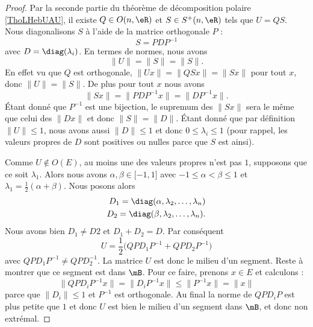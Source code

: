 \begin{proof}
    Par la seconde partie du théorème de décomposition polaire \ref{ThoLHebUAU}, il existe \( Q\in O(n,\eR)\) et \( S\in S^+(n,\eR)\) tels que \( U=QS\). Nous diagonalisons \( S\) à l'aide de la matrice orthogonale \( P\) :
    \begin{equation}
        S=PDP^{-1}
    \end{equation}
    avec \( D=\diag(\lambda_i)\). En termes de normes, nous avons
    \begin{equation}
        \| U \|=\| S \|=\| S \|.
    \end{equation}
    En effet vu que \( Q\) est orthogonale, \( \| Ux \|=\| QSx \|=\| Sx \|\) pour tout \( x\), donc \( \| U \|=\| S \|\). De plus pour tout \( x\) nous avons
    \begin{equation}
        \| Sx \|=\| PDP^{-1} x \|=\| DP^{-1}x \|.
    \end{equation}
    Étant donné que \( P^{-1}\) est une bijection, le supremum des \( \| Sx \|\) sera le même que celui des \( \| Dx \|\) et donc \( \| S \|=\| D \|\). Étant donné que par définition \( \| U \|\leq 1\), nous avons aussi \( \| D \|\leq 1\) et donc \( 0\leq\lambda_i\leq 1\) (pour rappel, les valeurs propres de \( D\) sont positives ou nulles parce que \( S\) est ainsi). 

    Comme \( U\notin O(E)\), au moins une des valeurs propres n'est pas \( 1\), supposons que ce soit \( \lambda_1\). Alors nous avons \( \alpha,\beta\in\mathopen[ -1 , 1 \mathclose]\) avec \( -1\leq \alpha<\beta\leq 1\) et \( \lambda_1=\frac{ 1 }{2}(\alpha+\beta)\). Nous posons alors
    \begin{subequations}
        \begin{align}
            D_1=\diag(\alpha,\lambda_2,\ldots, \lambda_n)\\
            D_2=\diag(\beta,\lambda_2,\ldots, \lambda_n).
        \end{align}
    \end{subequations}
    Nous avons bien \( D_1\neq D2\) et \( D_1+ D_2=D\). Par conséquent
    \begin{equation}
        U=\frac{ 1 }{2}\big( QPD_1P^{-1}+QPD_2P^{-1} \big)
    \end{equation}
    avec \( QPD_1P^{-1}\neq QPD_2^{-1}\). La matrice \( U \) est donc le milieu d'un segment. Reste à montrer que ce segment est dans \( \mB\). Pour ce faire, prenons \( x\in E\) et calculons :
    \begin{equation}
        \| QPD_iP^{-1}x \|=\| D_iP^{-1}x \|\leq\| P^{-1}x \|=\| x \|
    \end{equation}
    parce que \( \| D_i \|\leq 1\) et \( P^{-1}\) est orthogonale. Au final la norme de \( QPD_iP\) est plus petite que \( 1\) et donc \( U\) est bien le milieu d'un segment dans \( \mB\), et donc non extrémal.
\end{proof}

